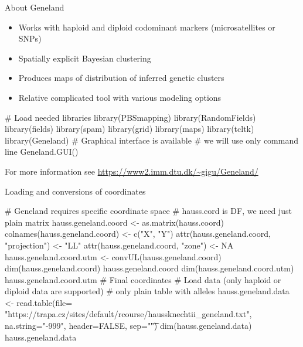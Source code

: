\documentclass[compress, ucs, xelatex, 11pt, xcolor=svgnames,
  hyperref={
    bookmarks=true,
    unicode=true,
    colorlinks=true,
    pdftitle={Molecular data in R},
    plainpages=false,
    pdfauthor={Vojtech Zeisek},
    pdfsubject={Course about phylogeny and evolution in R},
    pdfcreator={XeLaTeX},
    pdfkeywords={R, evolution, phylogeny, molecular data},
    linkcolor=Tomato,
    anchorcolor=SaddleBrown,
    citecolor=Goldenrod,
    filecolor=DarkMagenta,
    menucolor=Sienna,
    urlcolor=DarkTurquoise,
    pdftex},
  url={hyphens, lowtilde} %
  ]{beamer}
\begin{document}
\begin{frame}[fragile]{About Geneland}
\begin{multicols}{2}
\begin{itemize}
 \item Works with haploid and diploid codominant markers (microsatellites or SNPs)
 \item Spatially explicit Bayesian clustering
 \item Produces maps of distribution of inferred genetic clusters
 \item Relative complicated tool with various modeling options
\end{itemize}
  \columnbreak
  \begin{spluscode}
    # Load needed libraries
    library(PBSmapping)
    library(RandomFields)
    library(fields)
    library(spam)
    library(grid)
    library(maps)
    library(tcltk)
    library(Geneland)
    # Graphical interface is available
    # we will use only command line
    Geneland.GUI()
  \end{spluscode}
\end{multicols}
For more information see \url{https://www2.imm.dtu.dk/~gigu/Geneland/}
\end{frame}

\begin{frame}[fragile]{Loading and conversions of coordinates}
  \begin{spluscode}
    # Geneland requires specific coordinate space
    # hauss.cord is DF, we need just plain matrix
    hauss.geneland.coord <- as.matrix(hauss.coord)
    colnames(hauss.geneland.coord) <- c("X", "Y")
    attr(hauss.geneland.coord, "projection") <- "LL"
    attr(hauss.geneland.coord, "zone") <- NA
    hauss.geneland.coord.utm <- convUL(hauss.geneland.coord)
    dim(hauss.geneland.coord)
    hauss.geneland.coord
    dim(hauss.geneland.coord.utm)
    hauss.geneland.coord.utm # Final coordinates
    # Load data (only haploid or diploid data are supported)
    # only plain table with alleles
    hauss.geneland.data <- read.table(file=
      "https://trapa.cz/sites/default/rcourse/haussknechtii_geneland.txt",
      na.string="-999", header=FALSE, sep="\t")
    dim(hauss.geneland.data)
    hauss.geneland.data
  \end{spluscode}
\end{frame}
\end{document}

